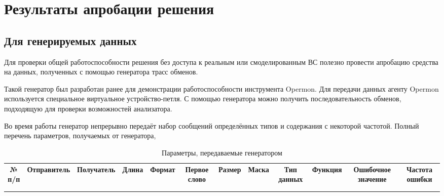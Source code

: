 \section{Результаты апробации решения}

\subsection{Для генерируемых данных}

Для проверки общей работоспособности решения без доступа к реальным 
или смоделированным ВС полезно провести апробацию средства на данных, 
полученных с помощью генератора трасс обменов.

Такой генератор был разработан ранее для демонстрации работоспособности 
инструмента Opermon. Для передачи данных агенту Opermon используется 
специальное виртуальное устройство-петля. С помощью генератора можно получить 
последовательность обменов, подходящую для проверки возможностей анализатора.

Во время работы генератор непрерывно передаёт набор сообщений определённых 
типов и содержания с некоторой частотой. Полный перечень параметров, получаемых 
от генератора, 

\begin{table}[]
\centering
\caption{Параметры, передаваемые генератором}
\label{my-label}
\begin{tabular}{llllllllllll}
\multicolumn{1}{c}{\textbf{№ п/п}} & \multicolumn{1}{c}{\textbf{Отправитель}} & 
\multicolumn{1}{c}{\textbf{Получатель}} & \multicolumn{1}{c}{\textbf{Длина}} & 
\multicolumn{1}{c}{\textbf{Формат}} & \multicolumn{1}{c}{\textbf{Первое слово}} 
& \multicolumn{1}{c}{\textbf{Размер}} & \multicolumn{1}{c}{\textbf{Маска}} & 
\multicolumn{1}{c}{\textbf{Тип данных}} & \multicolumn{1}{c}{\textbf{Функция}} & 
\multicolumn{1}{c}{\textbf{Ошибочное значение}} & 
\multicolumn{1}{c}{\textbf{Частота ошибки}} \\
                                   &                                          &  
                                       &                                    &    
                                 &                                           &   
                                  &                                    &         
                                &                                      &         
                                        &                                        
     \\
                                   &                                          &  
                                       &                                    &    
                                 &                                           &   
                                  &                                    &         
                                &                                      &         
                                        &                                        
    
\end{tabular}
\end{table}
